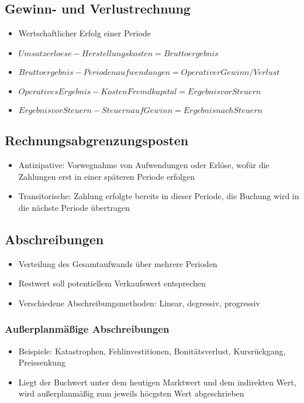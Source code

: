 \subsection{Gewinn- und Verlustrechnung}
\begin{itemize}
	\item Wertschaftlicher Erfolg einer Periode
	\item \(Umsatzerloese - Herstellungskosten = Bruttoergebnis\)
	\item \(Bruttoergebnis - Periodenaufwendungen = Operativer Gewinn/Verlust\)
	\item \(Operatives Ergebnis - Kosten Fremdkapital = Ergebnis vor Steuern\)
	\item \(Ergebnis vor Steuern - Steuern auf Gewinn = Ergebnis nach Steuern\)
\end{itemize}


\subsection{Rechnungsabgrenzungsposten}
\begin{itemize}
	\item Antizipative: Vorwegnahme von Aufwendungen oder Erlöse, wofür die Zahlungen erst in einer späteren Periode erfolgen
	\item Transitorische: Zahlung erfolgte bereits in dieser Periode, die Buchung wird in die nächste Periode übertragen
\end{itemize}


\subsection{Abschreibungen}
\begin{itemize}
	\item Verteilung des Gesamtaufwands über mehrere Perioden
	\item Restwert soll potentiellem Verkaufswert entsprechen
	\item Verschiedene Abschreibungsmethoden: Linear, degressiv, progressiv
\end{itemize}

\subsubsection{Außerplanmäßige Abschreibungen}
\begin{itemize}
	\item Beispiele: Katastrophen, Fehlinvestitionen, Bonitätsverlust, Kursrückgang, Preissenkung
	\item Liegt der Buchwert unter dem heutigen Marktwert und dem indirekten Wert, wird außerplanmäßig zum jeweils höcgsten Wert abgeschrieben
\end{itemize}


